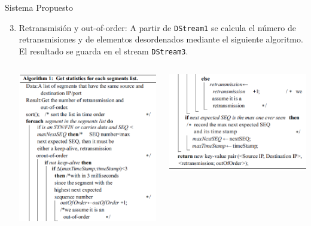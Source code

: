 \documentclass[aspectratio=149]{beamer}
\begin{document}
\begin{frame}{Sistema Propuesto}
    \begin{enumerate}
        \setcounter{enumi}{2}
        \item Retransmisión y out-of-order: A partir de \texttt{DStream1} se calcula el número de retransmisiones y de elementos desordenados mediante el siguiente algoritmo. El resultado se guarda en el stream \texttt{DStream3}.
        \begin{columns}
        \begin{column}{0.4\textwidth}
        	\includegraphics[width=1.0\textwidth]{img/alg1_1.png}
        \end{column}
        \begin{column}{0.4\textwidth}
        	\includegraphics[width=1.0\textwidth]{img/alg1_2.png}
        \end{column}
        \end{columns}
    \end{enumerate}
\end{frame}
\end{document}
